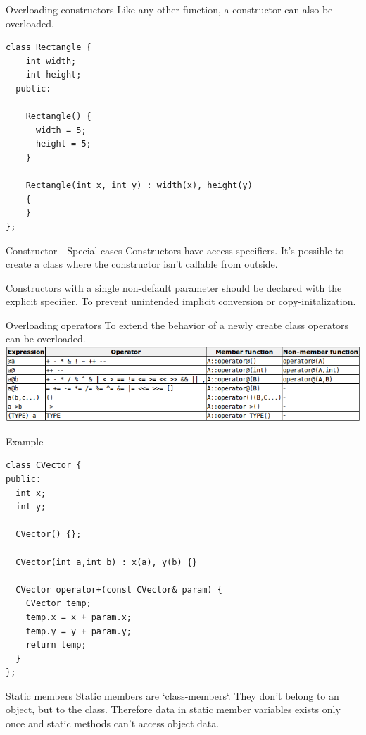 \documentclass{beamer}
\begin{document}
\begin{frame}[fragile]{Overloading constructors}
Like any other function, a constructor can also be overloaded.
\begin{lstlisting}
class Rectangle {
    int width;
    int height;
  public:

    Rectangle() {
      width = 5;
      height = 5;
    }

    Rectangle(int x, int y) : width(x), height(y)
    {
    }
};
\end{lstlisting}
\end{frame}

\begin{frame}{Constructor - Special cases}
Constructors have access specifiers. It's possible to create a class where the
constructor isn't callable from outside.

Constructors with a single non-default parameter should be declared with the explicit
specifier. To prevent unintended implicit conversion or copy-initalization.
\end{frame}

\begin{frame}{Overloading operators}
To extend the behavior of a newly create class operators can be overloaded.
\includegraphics[scale=0.4]{img/OperatorOverload.png}
\end{frame}

\begin{frame}[fragile]{Example}
\begin{lstlisting}
class CVector {
public:
  int x;
  int y;

  CVector() {};

  CVector(int a,int b) : x(a), y(b) {}

  CVector operator+(const CVector& param) {
    CVector temp;
    temp.x = x + param.x;
    temp.y = y + param.y;
    return temp;
  }
};
\end{lstlisting}
\end{frame}

\begin{frame}{Static members}
Static members are `class-members`. They don't belong to an object, but to the
class. Therefore data in static member variables exists only once and static
methods can't access object data.
\end{frame}
\end{document}
